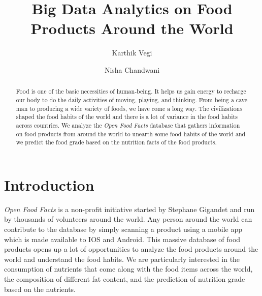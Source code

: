 \documentclass[sigconf]{acmart}
\begin{document}
\title{Big Data Analytics on Food Products Around the World}

\author{Karthik Vegi}

\author{Nisha Chandwani}

\renewcommand{\shortauthors}{kvegi, nchandwa}

\begin{abstract}
Food is one of the basic necessities of human-being. It helps us gain energy to recharge our body to do the daily activities of moving, playing, and thinking. From being a cave man to producing a wide variety of foods, we have come a long way. The civilizations shaped the food habits of the world and there is a lot of variance in the food habits across countries. We analyze the {\em Open Food Facts} database that gathers information on food products from around the world to unearth some food habits of the world and we predict the food grade based on the nutrition facts of the food products.
\end{abstract}


\maketitle

\section{Introduction}
{\em Open Food Facts} is a non-profit initiative started by Stephane Gigandet and run by thousands of volunteers around the world. Any person around the world can contribute to the database by simply scanning a product using a mobile app which is made available to IOS and Android. This massive database of food products opens up a lot of opportunities to analyze the food products around the world and understand the food habits. We are particularly interested in the consumption of nutrients that come along with the food items across the world, the composition of different fat content, and the prediction of nutrition grade based on the nutrients.
\end{document}
